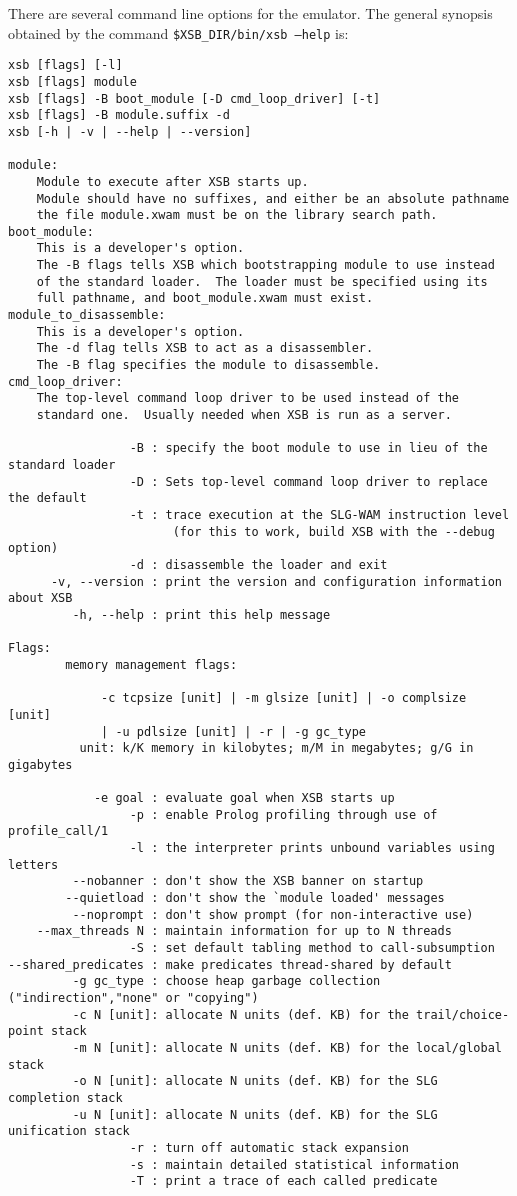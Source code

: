 There are several command line options for the emulator. The general 
synopsis obtained by the command {\tt \$XSB\_DIR/bin/xsb --help} is: 
{\small 
\begin{verbatim}
xsb [flags] [-l] 
xsb [flags] module
xsb [flags] -B boot_module [-D cmd_loop_driver] [-t] 
xsb [flags] -B module.suffix -d
xsb [-h | -v | --help | --version]

module:
    Module to execute after XSB starts up.
    Module should have no suffixes, and either be an absolute pathname
    the file module.xwam must be on the library search path.
boot_module:
    This is a developer's option.
    The -B flags tells XSB which bootstrapping module to use instead
    of the standard loader.  The loader must be specified using its
    full pathname, and boot_module.xwam must exist.
module_to_disassemble:
    This is a developer's option.
    The -d flag tells XSB to act as a disassembler.
    The -B flag specifies the module to disassemble.
cmd_loop_driver:
    The top-level command loop driver to be used instead of the
    standard one.  Usually needed when XSB is run as a server.

                 -B : specify the boot module to use in lieu of the standard loader
                 -D : Sets top-level command loop driver to replace the default
                 -t : trace execution at the SLG-WAM instruction level
                       (for this to work, build XSB with the --debug option)
                 -d : disassemble the loader and exit
      -v, --version : print the version and configuration information about XSB
         -h, --help : print this help message

Flags: 
        memory management flags:

             -c tcpsize [unit] | -m glsize [unit] | -o complsize [unit] 
             | -u pdlsize [unit] | -r | -g gc_type
          unit: k/K memory in kilobytes; m/M in megabytes; g/G in gigabytes

            -e goal : evaluate goal when XSB starts up
                 -p : enable Prolog profiling through use of profile_call/1
                 -l : the interpreter prints unbound variables using letters
         --nobanner : don't show the XSB banner on startup
        --quietload : don't show the `module loaded' messages
         --noprompt : don't show prompt (for non-interactive use)
    --max_threads N : maintain information for up to N threads
                 -S : set default tabling method to call-subsumption
--shared_predicates : make predicates thread-shared by default
         -g gc_type : choose heap garbage collection ("indirection","none" or "copying") 
         -c N [unit]: allocate N units (def. KB) for the trail/choice-point stack
         -m N [unit]: allocate N units (def. KB) for the local/global stack
         -o N [unit]: allocate N units (def. KB) for the SLG completion stack
         -u N [unit]: allocate N units (def. KB) for the SLG unification stack
                 -r : turn off automatic stack expansion
                 -s : maintain detailed statistical information
                 -T : print a trace of each called predicate
\end{verbatim}
}

